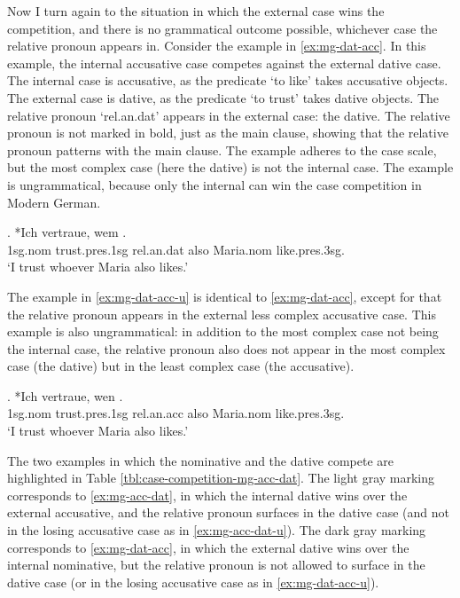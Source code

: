 Now I turn again to the situation in which the external case wins the competition, and there is no grammatical outcome possible, whichever case the relative pronoun appears in.
Consider the example in \ref{ex:mg-dat-acc}. In this example, the internal accusative case competes against the external dative case.
The internal case is accusative, as the predicate  `to like' takes accusative objects.
The external case is dative, as the predicate  `to trust' takes dative objects.
The relative pronoun  `\ac{rel}.\ac{an}.\ac{dat}' appears in the external case: the dative. The relative pronoun is not marked in bold, just as the main clause, showing that the relative pronoun patterns with the main clause.
The example adheres to the case scale, but the most complex case (here the dative) is not the internal case. The example is ungrammatical, because only the internal can win the case competition in Modern German.

\exg. *Ich vertraue, wem   . \\
1\ac{sg}.\ac{nom} trust.\ac{pres}.1\ac{sg}\scsub{[dat]} \ac{rel}.\ac{an}.\ac{dat} also Maria.\ac{nom} like.\ac{pres}.3\ac{sg}\scsub{[acc]}.\\
`I trust whoever Maria also likes.' \label{ex:mg-dat-acc}

The example in \ref{ex:mg-dat-acc-u} is identical to \ref{ex:mg-dat-acc}, except for that the relative pronoun appears in the external less complex accusative case. This example is also ungrammatical: in addition to the most complex case not being the internal case, the relative pronoun also does not appear in the most complex case (the dative) but in the least complex case (the accusative).

\exg. *Ich vertraue, wen   . \\
1\ac{sg}.\ac{nom} trust.\ac{pres}.1\ac{sg}\scsub{[dat]} \ac{rel}.\ac{an}.\ac{acc} also Maria.\ac{nom} like.\ac{pres}.3\ac{sg}\scsub{[acc]}.\\
`I trust whoever Maria also likes.' \label{ex:mg-dat-acc-u}

The two examples in which the nominative and the dative compete are highlighted in Table \ref{tbl:case-competition-mg-acc-dat}.
The light gray marking corresponds to \ref{ex:mg-acc-dat}, in which the internal dative wins over the external accusative, and the relative pronoun surfaces in the dative case (and not in the losing accusative case as in \ref{ex:mg-acc-dat-u}).
The dark gray marking corresponds to \ref{ex:mg-dat-acc}, in which the external dative wins over the internal nominative, but the relative pronoun is not allowed to surface in the dative case (or in the losing accusative case as in \ref{ex:mg-dat-acc-u}).

